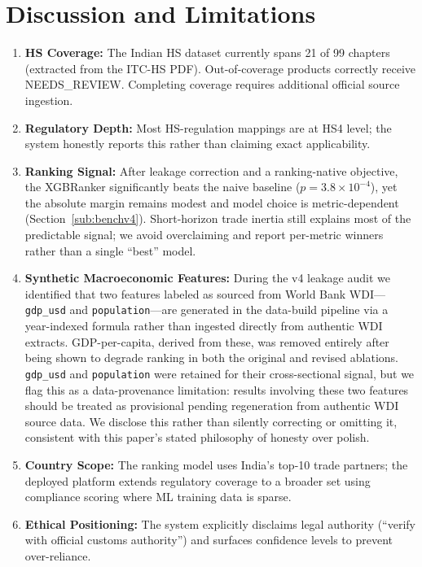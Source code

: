 \documentclass[conference]{IEEEtran}
\begin{document}
\section{Discussion and Limitations}
\label{sec:limitations}
\begin{enumerate}
\item \textbf{HS Coverage:} The Indian HS dataset currently spans 21 of 99
chapters (extracted from the ITC-HS PDF). Out-of-coverage products
correctly receive NEEDS\_REVIEW. Completing coverage requires additional
official source ingestion.
\item \textbf{Regulatory Depth:} Most HS-regulation mappings are at HS4
level; the system honestly reports this rather than claiming exact
applicability.
\item \textbf{Ranking Signal:} After leakage correction and a
ranking-native objective, the XGBRanker significantly beats the naive
baseline ($p=3.8\times10^{-4}$), yet the absolute margin remains modest and
model choice is metric-dependent (Section~\ref{sub:benchv4}). Short-horizon trade
inertia still explains most of the predictable signal; we avoid
overclaiming and report per-metric winners rather than a single ``best''
model.
\item \textbf{Synthetic Macroeconomic Features:} During the v4 leakage
audit we identified that two features labeled as sourced from World Bank
WDI---\texttt{gdp\_usd} and \texttt{population}---are generated in the
data-build pipeline via a year-indexed formula rather than ingested
directly from authentic WDI extracts. GDP-per-capita, derived from these,
was removed entirely after being shown to degrade ranking in both the
original and revised ablations. \texttt{gdp\_usd} and \texttt{population}
were retained for their cross-sectional signal, but we flag this as a
data-provenance limitation: results involving these two features should be
treated as provisional pending regeneration from authentic WDI source
data. We disclose this rather than silently correcting or omitting it,
consistent with this paper's stated philosophy of honesty over polish.
\item \textbf{Country Scope:} The ranking model uses India's top-10 trade
partners; the deployed platform extends regulatory coverage to a broader
set using compliance scoring where ML training data is sparse.
\item \textbf{Ethical Positioning:} The system explicitly disclaims legal
authority (``verify with official customs authority'') and surfaces
confidence levels to prevent over-reliance.
\end{enumerate}
\end{document}
